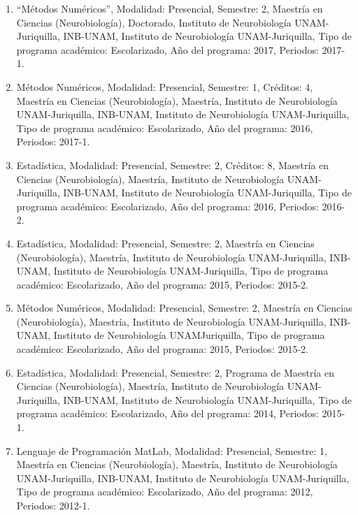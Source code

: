 \begin{enumerate}
\item “Métodos Numéricos”, Modalidad: Presencial, Semestre: 2, Maestría en Ciencias (Neurobiología), Doctorado, Instituto de 
Neurobiología UNAM-Juriquilla, INB-UNAM, Instituto de Neurobiología UNAM-Juriquilla, Tipo de programa académico: 
Escolarizado, Año del programa: 2017, Periodos: 2017-1.

\item Métodos Numéricos, Modalidad: Presencial, Semestre: 1, Créditos: 4, Maestría en Ciencias (Neurobiología), Maestría, 
Instituto de Neurobiología UNAM-Juriquilla, INB-UNAM, Instituto de Neurobiología UNAM-Juriquilla, Tipo de programa académico: 
Escolarizado, Año del programa: 2016, Periodos: 2017-1.

\item Estadística, Modalidad: Presencial, Semestre: 2, Créditos: 8, Maestría en Ciencias (Neurobiología), Maestría, Instituto 
de Neurobiología UNAM-Juriquilla, INB-UNAM, Instituto de Neurobiología UNAM-Juriquilla, Tipo de programa académico: 
Escolarizado, Año del programa: 2016, Periodos: 2016-2.

\item Estadística, Modalidad: Presencial, Semestre: 2, Maestría en Ciencias (Neurobiología), Maestría, Instituto de 
Neurobiología UNAM-Juriquilla, INB-UNAM, Instituto de Neurobiología UNAM-Juriquilla, Tipo de programa académico: 
Escolarizado, Año del programa: 2015, Periodos: 2015-2.

\item Métodos Numéricos, Modalidad: Presencial, Semestre: 2, Maestría en Ciencias (Neurobiología), Maestría, Instituto de 
Neurobiología UNAM-Juriquilla, INB-UNAM, Instituto de Neurobiología UNAMJuriquilla, Tipo de programa académico: Escolarizado, 
Año del programa: 2015, Periodos: 2015-2.

\item Estadística, Modalidad: Presencial, Semestre: 2, Programa de Maestría en Ciencias (Neurobiología), Maestría, Instituto 
de 
Neurobiología UNAM-Juriquilla, INB-UNAM, Instituto de Neurobiología UNAM-Juriquilla, Tipo de programa académico: 
Escolarizado, Año del programa: 2014, Periodos: 2015-1.

\item Lenguaje de Programación MatLab, Modalidad: Presencial, Semestre: 1, Maestría en Ciencias (Neurobiología), Maestría, 
Instituto de Neurobiología UNAM-Juriquilla, INB-UNAM, Instituto de Neurobiología UNAM-Juriquilla, Tipo de programa académico: 
Escolarizado, Año del programa: 2012, Periodos: 2012-1.


\end{enumerate}
